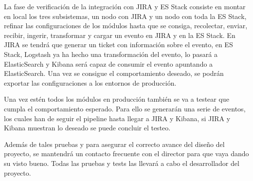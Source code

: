 La fase de verificación de la integración con JIRA y ES Stack consiste en montar en local los tres subsistemas, un nodo con JIRA y un nodo con toda la ES Stack, refinar las configuraciones de los módulos hasta que se consiga, recolectar, enviar, recibir, ingerir, transformar y cargar un evento en JIRA y en la ES Stack. En JIRA se tendrá que generar un ticket con información sobre el evento, en ES Stack, Logstash ya ha hecho una transformación del evento, lo pasará a ElasticSearch y Kibana será capaz de consumir el evento apuntando a ElasticSearch. Una vez se consigue el comportamiento deseado, se podrán exportar las configuraciones a los entornos de producción.

Una vez estén todos los módulos en producción también se va a testear que cumpla el comportamiento esperado. Para ello se generarán una serie de eventos, los cuales han de seguir el pipeline hasta llegar a JIRA y Kibana, si JIRA y Kibana muestran lo deseado se puede concluir el testeo.

Además de tales pruebas y para asegurar el correcto avance del diseño del proyecto, se mantendrá un contacto frecuente con el director para que vaya dando su visto bueno. Todas las pruebas y tests las llevará a cabo el desarrollador del proyecto.